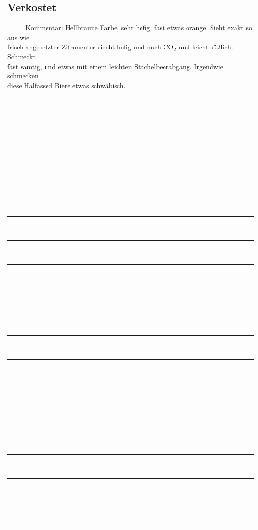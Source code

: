 \documentclass[12pt,oneside,a4paper]{scrartcl}
\begin{document}
{\subsection*{Verkostet}
\begin{tabbing}
	\hspace{1cm} \= \hspace{1cm} \= \hspace{1cm} \= \hspace{1cm} \= \hspace{1cm} \= \hspace{1cm} \= \hspace{1cm} \= \hspace{1cm} \= \kill
	\> Kommentar: \>\>\> Hellbraune Farbe, sehr hefig, fast etwas orange. Sieht exakt so aus wie\\
	\> \> frisch angesetzter Zitronentee riecht hefig und nach CO$_2$ und leicht süßlich. Schmeckt\\
	\> \>  fast samtig, und etwas mit einem leichten Stachelbeerabgang. Irgendwie schmecken\\
	\> \> diese Halfassed Biere etwas schwäbisch.\\
	\> \>  \rule[-0.2cm]{15.3cm}{1pt}\\
	\> \>  \rule[-0.2cm]{15.3cm}{1pt}\\
	\> \>  \rule[-0.2cm]{15.3cm}{1pt}\\		
	\> \>  \rule[-0.2cm]{15.3cm}{1pt}\\
	\> \>  \rule[-0.2cm]{15.3cm}{1pt}\\
	\> \>  \rule[-0.2cm]{15.3cm}{1pt}\\
	\> \>  \rule[-0.2cm]{15.3cm}{1pt}\\
	\> \>  \rule[-0.2cm]{15.3cm}{1pt}\\
	\> \>  \rule[-0.2cm]{15.3cm}{1pt}\\
	\> \>  \rule[-0.2cm]{15.3cm}{1pt}\\
	\> \>  \rule[-0.2cm]{15.3cm}{1pt}\\
	\> \>  \rule[-0.2cm]{15.3cm}{1pt}\\
	\> \>  \rule[-0.2cm]{15.3cm}{1pt}\\
	\> \>  \rule[-0.2cm]{15.3cm}{1pt}\\
	\> \>  \rule[-0.2cm]{15.3cm}{1pt}\\
	\> \>  \rule[-0.2cm]{15.3cm}{1pt}\\
	\> \>  \rule[-0.2cm]{15.3cm}{1pt}\\
	\> \>  \rule[-0.2cm]{15.3cm}{1pt}\\
	\> \>  \rule[-0.2cm]{15.3cm}{1pt}
\end{tabbing}}
\end{document}

